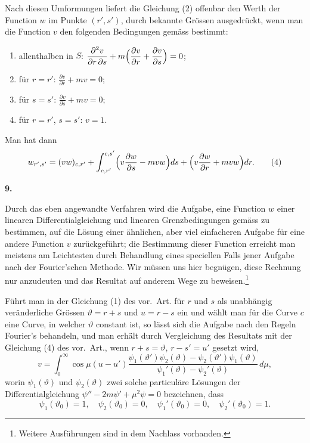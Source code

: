 \documentclass[12pt,a4paper]{book}
\theoremstyle{definition}
\theoremstyle{remark}
\begin{document}
Nach diesen Umformungen liefert die Gleichung (2) offenbar den Werth der Function $w$ im Punkte $(r', s')$, durch bekannte Gr\"ossen ausgedr\"uckt, wenn man die Function $v$ den folgenden Bedingungen gem\"ass bestimmt:

\begin{enumerate}
\item allenthalben in $S$: $\displaystyle\frac{\partial^{2}v}{\partial r\,\partial s} + m\Bigl(\frac{\partial v}{\partial r} + \frac{\partial v}{\partial s}\Bigr) = 0$;
\item f\"ur $r = r'$: $\displaystyle\frac{\partial v}{\partial r} + mv = 0$;
\item f\"ur $s = s'$: $\displaystyle\frac{\partial v}{\partial s} + mv = 0$;
\item f\"ur $r = r'$, $s = s'$: $v = 1$.
\end{enumerate}

Man hat dann
\begin{equation*}
w_{r',s'} = (vw)_{c,r'} + \int_{c,r'}^{c,s'}\Bigl(v\frac{\partial w}{\partial s} - mvw\Bigr)ds + \Bigl(v\frac{\partial w}{\partial r} + mvw\Bigr)dr.\tag{4}
\end{equation*}

\newpage
\begin{center}
\textbf{9.}
\end{center}

Durch das eben angewandte Verfahren wird die Aufgabe, eine Function $w$ einer linearen Differentialgleichung und linearen Grenzbedingungen gem\"ass zu bestimmen, auf die L\"osung einer \"ahnlichen, aber viel einfacheren Aufgabe f\"ur eine andere Function $v$ zur\"uckgef\"uhrt; die Bestimmung dieser Function erreicht man meistens am Leichtesten durch Behandlung eines speciellen Falls jener Aufgabe nach der Fourier'schen Methode. Wir m\"ussen uns hier begn\"ugen, diese Rechnung nur anzudeuten und das Resultat auf anderem Wege zu beweisen.\footnote{Weitere Ausf\"uhrungen sind in dem Nachlass vorhanden.}

F\"uhrt man in der Gleichung (1) des vor.~Art. f\"ur $r$ und $s$ als unabh\"angig ver\"anderliche Gr\"ossen $\vartheta = r + s$ und $u = r - s$ ein und w\"ahlt man f\"ur die Curve $c$ eine Curve, in welcher $\vartheta$ constant ist, so l\"asst sich die Aufgabe nach den Regeln Fourier's behandeln, und man erh\"alt durch Vergleichung des Resultats mit der Gleichung (4) des vor.~Art., wenn $r + s = \vartheta$, $r - s' = u'$ gesetzt wird,
\[
v = \int_{0}^{\infty}\cos\mu(u - u')\frac{\psi_{1}(\vartheta')\psi_{2}(\vartheta) - \psi_{2}(\vartheta')\psi_{1}(\vartheta)}{\psi_{1}'(\vartheta) - \psi_{2}'(\vartheta)}\,d\mu,
\]
worin $\psi_{1}(\vartheta)$ und $\psi_{2}(\vartheta)$ zwei solche particul\"are L\"osungen der Differentialgleichung $\psi'' - 2m\psi' + \mu^{2}\psi = 0$ bezeichnen, dass
\[
\psi_{1}(\vartheta_{0}) = 1,\quad \psi_{2}(\vartheta_{0}) = 0,\quad \psi_{1}'(\vartheta_{0}) = 0,\quad \psi_{2}'(\vartheta_{0}) = 1.
\]
\end{document}
